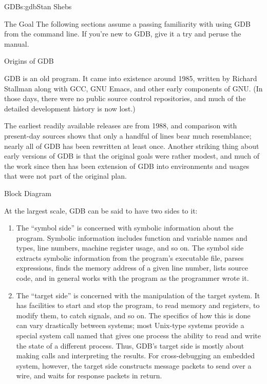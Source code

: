 \begin{aosachapter}{GDB}{s:gdb}{Stan Shebs}
\begin{aosasect1}{The Goal}
The following sections assume a passing familiarity with using GDB
from the command line. If you're new to GDB, give it a try and peruse
the manual.\cite{bib:gdb-manual}

\end{aosasect1}

\begin{aosasect1}{Origins of GDB}

GDB is an old program.  It came into existence around 1985, written by
Richard Stallman along with GCC, GNU Emacs, and other early components
of GNU.  (In those days, there were no public source control
repositories, and much of the detailed development history is now
lost.)

The earliest readily available releases are from 1988, and comparison
with present-day sources shows that only a handful of lines bear much
resemblance; nearly all of GDB has been rewritten at least once.
Another striking thing about early versions of GDB is that the
original goals were rather modest, and much of the work since then has
been extension of GDB into environments and usages that were not part
of the original plan.

\end{aosasect1}

\begin{aosasect1}{Block Diagram}


At the largest scale, GDB can be said to have two sides to it:

\begin{enumerate}
\item The ``symbol side'' is concerned with symbolic information about
the program.  Symbolic information includes function and variable
names and types, line numbers, machine register usage, and so on.
The symbol side extracts symbolic information from the program's
executable file, parses expressions, finds the memory address of a
given line number, lists source code, and in general works with
the program as the programmer wrote it.

\item The ``target side'' is concerned with the manipulation of the
target system.  It has facilities to start and stop the program, to
read memory and registers, to modify them, to catch signals, and so
on.  The specifics of how this is done can vary drastically between
systems; most Unix-type systems provide a special system call named
 that gives one process the ability to read and write the
state of a different process. Thus, GDB's target side is
mostly about making  calls and interpreting the results.
For cross-debugging an embedded system, however, the target side constructs
message packets to send over a wire, and waits for response packets in
return.
\end{enumerate}


\end{aosasect1}
\end{aosachapter}
